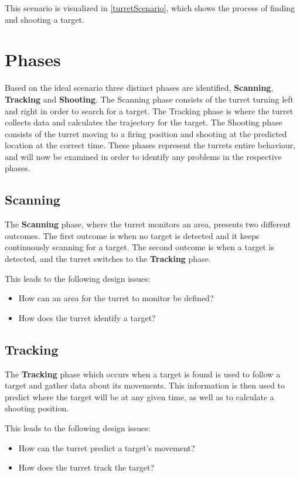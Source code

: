 This scenario is visualized in \autoref{turretScenario}, which shows the process
of finding and shooting a target.


\section{Phases}
Based on the ideal scenario three distinct phases are identified,
\textbf{Scanning}, \textbf{Tracking} and \textbf{Shooting}. The Scanning phase
consists of the turret turning left and right in order to search for a target.
The Tracking phase is where the turret collects data and calculates the
trajectory for the target. The Shooting phase consists of the turret moving to
a firing position and shooting at the predicted location at the correct time.
These phases represent the turrets entire behaviour, and will now be examined in
order to identify any problems in the respective phases.

\subsection{Scanning}
The \textbf{Scanning} phase, where the turret monitors an area, presents two
different outcomes. The first outcome is when no target is detected and it
keeps continuously scanning for a target. The second outcome is when a target
is detected, and the turret switches to the \textbf{Tracking} phase.\nl

This leads to the following design issues:
\begin{itemize}
  \item How can an area for the turret to monitor be defined?
  \item How does the turret identify a target?
\end{itemize}

\subsection{Tracking}
The \textbf{Tracking} phase which occurs when a target is found is used to
follow a target and gather data about its movements. This information is then used to
predict where the target will be at any given time, as well as to calculate a
shooting position.\nl

This leads to the following design issues:
\begin{itemize}
  \item How can the turret predict a target's movement?
  \item How does the turret track the target?
\end{itemize}

